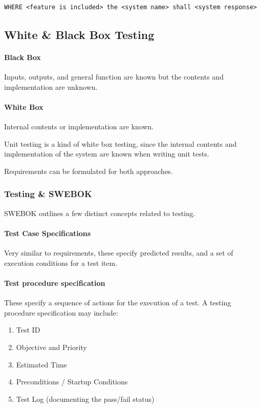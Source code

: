 \begin{verbatim}
WHERE <feature is included> the <system name> shall <system response>
\end{verbatim}

\subsection{White \& Black Box Testing}

\paragraph{Black Box} Inputs, outputs, and general function are known but the contents and implementation are unknown. 

\paragraph{White Box} Internal contents or implementation are known.

Unit testing is a kind of white box testing, since the internal contents and implementation of the system are known when writing unit tests.

Requirements can be formulated for both approaches.

\subsubsection{Testing \& SWEBOK}
SWEBOK outlines a few distinct concepts related to testing.

\paragraph{Test Case Specifications} Very similar to requirements, these specify predicted results, and a set of execution conditions for a test item.

\paragraph{Test procedure specification} These specify a sequence of actions for the execution of a test. A testing procedure specification may include:

\begin{enumerate}
	\item Test ID 
	\item Objective and Priority
	\item Estimated Time 
	\item Preconditions / Startup Conditions
	\item Test Log (documenting the pass/fail status)
\end{enumerate}

